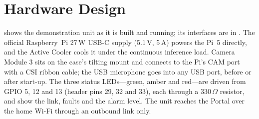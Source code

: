 \section{Hardware Design}
\label{sec:hwdesign}
 shows the demonstration unit as it is built and running; its interfaces are in . The official Raspberry~Pi 27\,W USB-C supply (5.1\,V, 5\,A) powers the Pi~5 directly, and the Active Cooler cools it under the continuous inference load. Camera Module 3 sits on the case's tilting mount and connects to the Pi's CAM port with a CSI ribbon cable; the USB microphone goes into any USB port, before or after start-up. The three status LEDs---green, amber and red---are driven from GPIO 5, 12 and 13 (header pins 29, 32 and 33), each through a 330\,$\Omega$ resistor, and show the link, faults and the alarm level. The unit reaches the Portal over the home Wi-Fi through an outbound link only.

